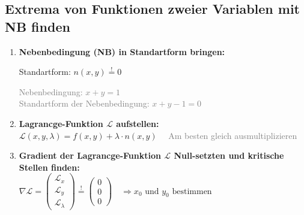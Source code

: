 \subsection{Extrema von Funktionen zweier Variablen mit NB finden}

\begin{enumerate}[itemsep=1ex]
    \item \textbf{Nebenbedingung (NB) in Standartform bringen:}\\
    \begin{minipage}[t]{0.4\columnwidth}
        Standartform: $n(x, y) \stackrel{!}{=} 0$
    \end{minipage}\hfill
    \begin{minipage}[t]{0.6\columnwidth}
            \textcolor{gray}{Nebenbedingung: $x + y = 1$}\\
            \textcolor{gray}{Standartform der Nebenbedingung: $x + y - 1 = 0$}
    \end{minipage}


    \item \textbf{Lagrancge-Funktion $\mathcal{L}$ aufstellen:}\\
    $\mathcal{L}(x, y, \lambda) =
    f(x, y) + \lambda \cdot n(x, y) \,\,\,\,\,\,$ \textcolor{gray}{Am besten gleich ausmultiplizieren}
    

    \item \textbf{Gradient der Lagrancge-Funktion $\mathcal{L}$ Null-setzten und kritische Stellen finden:}\\
    $\nabla \mathcal{L}=
    \begin{pmatrix}
        \mathcal{L}_x\\
        \mathcal{L}_y\\
        \mathcal{L}_\lambda
    \end{pmatrix} \stackrel{!}{=}
    \begin{pmatrix}
        0\\
        0\\
        0
    \end{pmatrix}
    \, \, \, \, \, \,
    \Rightarrow 
    x_0 \text{ und } y_0 \text{ bestimmen}$\\


\end{enumerate}
